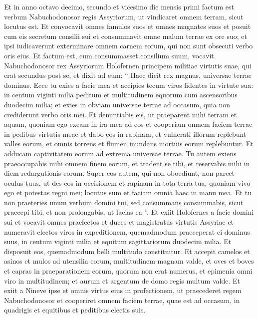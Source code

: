 \begin{biblechapter}
\begin{biblechapter}
\verse Et in anno octavo decimo, secundo et vicesimo die mensis primi factum est verbum Nabuchodonosor regis Assyriorum, ut vindicaret omnem terram, sicut locutus est. 
\verse Et convocavit omnes famulos suos et omnes magnates suos et posuit cum eis secretum consilii sui et consummavit omne malum terrae ex ore suo; 
\verse et ipsi iudicaverunt exterminare omnem carnem eorum, qui non sunt obsecuti verbo oris eius. 
\verse Et factum est, cum consummasset consilium suum, vocavit Nabuchodonosor rex Assyriorum Holofernen principem militiae virtutis suae, qui erat secundus post se, 
\verse et dixit ad eum: “ Haec dicit rex magnus, universae terrae dominus. Ecce tu exies a facie mea et accipies tecum viros fidentes in virtute sua: in centum viginti milia peditum et multitudinem equorum cum ascensoribus duodecim milia; 
\verse et exies in obviam universae terrae ad occasum, quia non crediderunt verbo oris mei. 
\verse Et denuntiabis eis, ut praeparent mihi terram et aquam, quoniam ego exeam in ira mea ad eos et cooperiam omnem faciem terrae in pedibus virtutis meae et dabo eos in rapinam, 
 \verse et vulnerati illorum replebunt valles eorum, et omnis torrens et flumen inundans mortuis eorum replebuntur. 
\verse Et adducam captivitatem eorum ad extrema universae terrae. 
\verse Tu autem exiens praeoccupabis mihi omnem finem eorum, et tradent se tibi, et reservabis mihi in diem redargutionis eorum. 
 \verse Super eos autem, qui non oboediunt, non parcet oculus tuus, ut des eos in occisionem et rapinam in tota terra tua, 
\verse quoniam vivo ego et potestas regni mei; locutus sum et faciam omnia haec in manu mea. 
\verse Et tu non praeteries unum verbum domini tui, sed consummans consummabis, sicut praecepi tibi, et non prolongabis, ut facias ea ”. 
\verse Et exiit Holofernes a facie domini sui et vocavit omnes praefectos et duces et magistratus virtutis Assyriae 
 \verse et numeravit electos viros in expeditionem, quemadmodum praeceperat ei dominus suus, in centum viginti milia et equitum sagittariorum duodecim milia.
 \verse Et disposuit eos, quemadmodum belli multitudo constituitur. 
\verse Et accepit camelos et asinos et mulos ad utensilia eorum, multitudinem magnam valde, et oves et boves et capras in praeparationem eorum, quorum non erat numerus, 
\verse et epimenia omni viro in multitudinem; et aurum et argentum de domo regis multum valde. 
\verse Et exiit a Nineve ipse et omnis virtus eius in profectionem, ut praecederet regem Nabuchodonosor et cooperiret omnem faciem terrae, quae est ad occasum, in quadrigis et equitibus et peditibus electis suis. 

\end{biblechapter}
\end{biblechapter}
